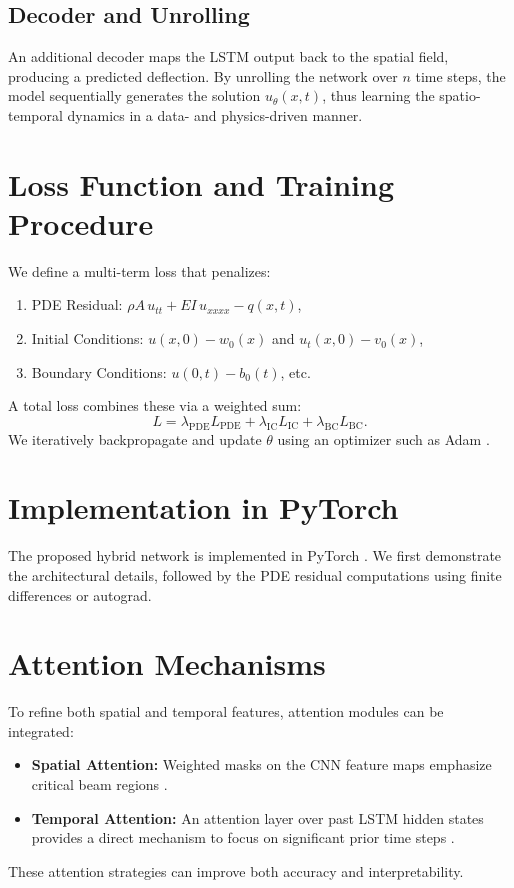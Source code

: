 \documentclass[Journal,letterpaper]{ascelike-new}
\begin{document}
\subsection{Decoder and Unrolling}
An additional decoder maps the LSTM output back to the spatial field, producing a predicted deflection. By unrolling the network over $n$ time steps, the model sequentially generates the solution $u_\theta(x,t)$, thus learning the spatio-temporal dynamics in a data- and physics-driven manner.

\section{Loss Function and Training Procedure}
We define a multi-term loss that penalizes:
\begin{enumerate}
    \item PDE Residual: $\rho A \, u_{tt} + E I \, u_{xxxx} - q(x,t)$,
    \item Initial Conditions: $u(x,0) - w_0(x)$ and $u_t(x,0) - v_0(x)$,
    \item Boundary Conditions: $u(0,t) - b_0(t)$, etc.
\end{enumerate}
A total loss combines these via a weighted sum:
\begin{equation}
L = \lambda_{\text{PDE}} L_{\text{PDE}} + \lambda_{\text{IC}} L_{\text{IC}} + \lambda_{\text{BC}} L_{\text{BC}}.
\end{equation}
We iteratively backpropagate and update $\theta$ using an optimizer such as Adam \cite{kingma2015adam}.

\section{Implementation in PyTorch}
The proposed hybrid network is implemented in PyTorch \cite{paszke2019pytorch}. We first demonstrate the architectural details, followed by the PDE residual computations using finite differences or autograd.

\section{Attention Mechanisms}
To refine both spatial and temporal features, attention modules can be integrated:
\begin{itemize}
    \item \textbf{Spatial Attention:} Weighted masks on the CNN feature maps emphasize critical beam regions \cite{woo2018cbam}.
    \item \textbf{Temporal Attention:} An attention layer over past LSTM hidden states provides a direct mechanism to focus on significant prior time steps \cite{bahdanau2015neural}.
\end{itemize}
These attention strategies can improve both accuracy and interpretability.
\end{document}
